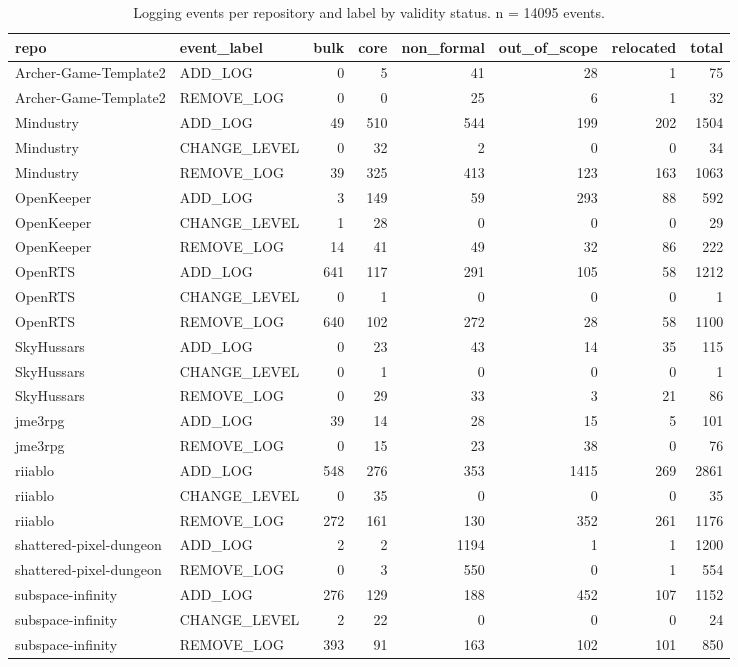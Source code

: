\begin{table}[htbp]
\centering
\small
\caption{Logging events per repository and label by validity status. n = 14095 events.}
\label{tab:rq1_events_validity}
\begin{tabular}{llrrrrrr}
\toprule
repo & event\_label & bulk & core & non\_formal & out\_of\_scope & relocated & total \\
\midrule
Archer-Game-Template2 & ADD\_LOG & 0 & 5 & 41 & 28 & 1 & 75 \\
Archer-Game-Template2 & REMOVE\_LOG & 0 & 0 & 25 & 6 & 1 & 32 \\
Mindustry & ADD\_LOG & 49 & 510 & 544 & 199 & 202 & 1504 \\
Mindustry & CHANGE\_LEVEL & 0 & 32 & 2 & 0 & 0 & 34 \\
Mindustry & REMOVE\_LOG & 39 & 325 & 413 & 123 & 163 & 1063 \\
OpenKeeper & ADD\_LOG & 3 & 149 & 59 & 293 & 88 & 592 \\
OpenKeeper & CHANGE\_LEVEL & 1 & 28 & 0 & 0 & 0 & 29 \\
OpenKeeper & REMOVE\_LOG & 14 & 41 & 49 & 32 & 86 & 222 \\
OpenRTS & ADD\_LOG & 641 & 117 & 291 & 105 & 58 & 1212 \\
OpenRTS & CHANGE\_LEVEL & 0 & 1 & 0 & 0 & 0 & 1 \\
OpenRTS & REMOVE\_LOG & 640 & 102 & 272 & 28 & 58 & 1100 \\
SkyHussars & ADD\_LOG & 0 & 23 & 43 & 14 & 35 & 115 \\
SkyHussars & CHANGE\_LEVEL & 0 & 1 & 0 & 0 & 0 & 1 \\
SkyHussars & REMOVE\_LOG & 0 & 29 & 33 & 3 & 21 & 86 \\
jme3rpg & ADD\_LOG & 39 & 14 & 28 & 15 & 5 & 101 \\
jme3rpg & REMOVE\_LOG & 0 & 15 & 23 & 38 & 0 & 76 \\
riiablo & ADD\_LOG & 548 & 276 & 353 & 1415 & 269 & 2861 \\
riiablo & CHANGE\_LEVEL & 0 & 35 & 0 & 0 & 0 & 35 \\
riiablo & REMOVE\_LOG & 272 & 161 & 130 & 352 & 261 & 1176 \\
shattered-pixel-dungeon & ADD\_LOG & 2 & 2 & 1194 & 1 & 1 & 1200 \\
shattered-pixel-dungeon & REMOVE\_LOG & 0 & 3 & 550 & 0 & 1 & 554 \\
subspace-infinity & ADD\_LOG & 276 & 129 & 188 & 452 & 107 & 1152 \\
subspace-infinity & CHANGE\_LEVEL & 2 & 22 & 0 & 0 & 0 & 24 \\
subspace-infinity & REMOVE\_LOG & 393 & 91 & 163 & 102 & 101 & 850 \\
\bottomrule
\end{tabular}
\end{table}
